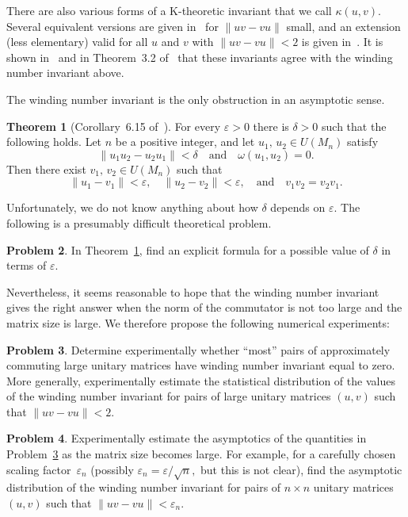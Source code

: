 \documentclass[10pt]{amsart}
\theoremstyle{definition}
\newtheorem{thm}{Theorem}[section]
\newtheorem{pbm}[thm]{Problem}
\newcommand{\dt}{\delta}
\newcommand{\ep}{\varepsilon}
\newcommand{\kp}{\kappa}
\newcommand{\om}{\omega}
\newcommand{\andeqn}{\,\,\,\,\,\, {\mbox{and}} \,\,\,\,\,\,}
\begin{document}
There are also various forms of a K-theoretic invariant
that we call $\kp (u, v).$
Several equivalent versions are given in~\cite{EL2} for
$\| u v - v u \|$ small, and an extension (less elementary)
valid for all $u$ and $v$ with $\| u v - v u \| < 2$ is given
in~\cite{Ex}.
It is shown in~\cite{EL2} and in Theorem~3.2 of~\cite{Ex}
that these invariants
agree with the winding number invariant above.

The winding number invariant is the only obstruction in an
asymptotic sense.

\begin{thm}[Corollary~6.15 of~\cite{ELP}]\label{UThm}
For every $\ep > 0$ there is $\dt > 0$ such that the following holds.
Let $n$ be a positive integer, and let $u_1, \, u_2 \in U(M_n)$
satisfy
\[
\| u_1 u_2 - u_2 u_1 \| < \dt \andeqn \om (u_1, u_2) = 0.
\]
Then there exist $v_1, \, v_2 \in U (M_n)$ such that
\[
\| u_1 - v_1 \| < \ep,  \,\,\,\,\,\, \| u_2 - v_2 \| < \ep,
\andeqn v_1 v_2 = v_2 v_1.
\]
\end{thm}

Unfortunately, we do not know anything about how $\dt$ depends
on $\ep.$
The following is a presumably difficult theoretical problem.

\begin{pbm}\label{PA}
In Theorem~\ref{UThm}, find an explicit formula for a possible
value of $\dt$ in terms of $\ep.$
\end{pbm}

Nevertheless, it seems reasonable to hope that the
winding number invariant gives the right answer when
the norm of the commutator is not too large and the matrix
size is large.
We therefore propose the following numerical experiments:

\begin{pbm}\label{ACProb2}
Determine experimentally whether
``most'' pairs of approximately commuting large
unitary matrices
have winding number invariant equal to zero.
More generally, experimentally estimate the statistical
distribution of the values of the winding number invariant
for pairs of large unitary matrices $(u, v)$ such that
$\| u v - v u \| < 2.$
\end{pbm}

\begin{pbm}\label{ACProb3}
Experimentally estimate the asymptotics of the quantities
in Problem~\ref{ACProb2} as the matrix size becomes large.
For example, for a carefully chosen scaling factor~$\ep_n$
(possibly $\ep_n = \ep / \sqrt{n},$ but this is not clear),
find the asymptotic distribution of the winding number invariant
for pairs of $n \times n$ unitary matrices $(u, v)$ such that
$\| u v - v u \| < \ep_n.$
\end{pbm}
\end{document}
